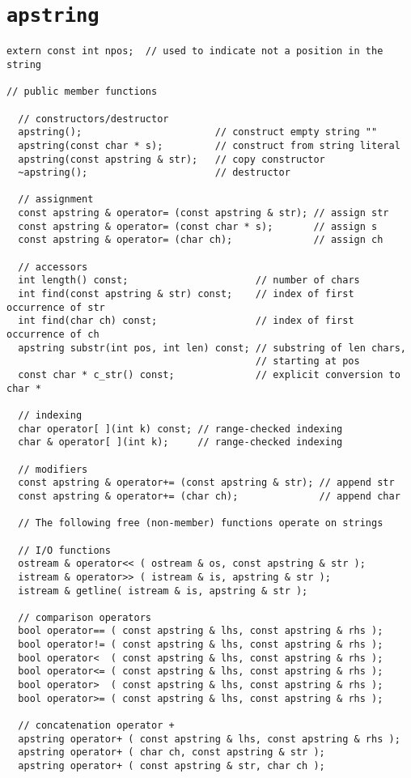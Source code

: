 \section{{\tt apstring}}

\begin{verbatim}
extern const int npos;  // used to indicate not a position in the string

// public member functions

  // constructors/destructor
  apstring();                       // construct empty string ""
  apstring(const char * s);         // construct from string literal
  apstring(const apstring & str);   // copy constructor
  ~apstring();                      // destructor

  // assignment
  const apstring & operator= (const apstring & str); // assign str
  const apstring & operator= (const char * s);       // assign s
  const apstring & operator= (char ch);              // assign ch

  // accessors
  int length() const;                      // number of chars
  int find(const apstring & str) const;    // index of first occurrence of str
  int find(char ch) const;                 // index of first occurrence of ch
  apstring substr(int pos, int len) const; // substring of len chars, 
                                           // starting at pos
  const char * c_str() const;              // explicit conversion to char *

  // indexing
  char operator[ ](int k) const; // range-checked indexing
  char & operator[ ](int k);     // range-checked indexing

  // modifiers
  const apstring & operator+= (const apstring & str); // append str
  const apstring & operator+= (char ch);              // append char

  // The following free (non-member) functions operate on strings

  // I/O functions
  ostream & operator<< ( ostream & os, const apstring & str );
  istream & operator>> ( istream & is, apstring & str );
  istream & getline( istream & is, apstring & str );

  // comparison operators
  bool operator== ( const apstring & lhs, const apstring & rhs );
  bool operator!= ( const apstring & lhs, const apstring & rhs );
  bool operator<  ( const apstring & lhs, const apstring & rhs );
  bool operator<= ( const apstring & lhs, const apstring & rhs );
  bool operator>  ( const apstring & lhs, const apstring & rhs );
  bool operator>= ( const apstring & lhs, const apstring & rhs );

  // concatenation operator +
  apstring operator+ ( const apstring & lhs, const apstring & rhs );
  apstring operator+ ( char ch, const apstring & str );
  apstring operator+ ( const apstring & str, char ch );
\end{verbatim}

